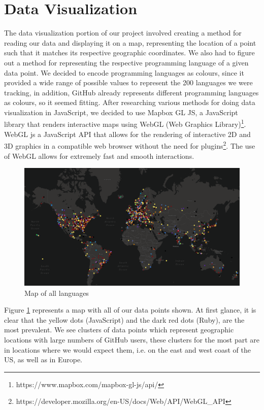 \documentclass[11pt]{article}
\begin{document}
\section{Data Visualization}
The data visualization portion of our project involved creating a method for reading our data and displaying it on a map, representing the location of a point such that it matches its respective geographic coordinates. We also had to figure out a method for representing the respective programming language of a given data point. We decided to encode programming languages as colours, since it provided a wide range of possible values to represent the 200 languages we were tracking, in addition, GitHub already represents different programming languages as colours, so it seemed fitting. 
After researching various methods for doing data visualization in JavaScript, we decided to use Mapbox GL JS, a JavaScript library that renders interactive maps using WebGL (Web Graphics Library)\footnote{https://www.mapbox.com/mapbox-gl-js/api/}. WebGL js a JavaScript API that allows for the rendering of interactive 2D and 3D graphics in a compatible web browser without the need for plugins\footnote{https://developer.mozilla.org/en-US/docs/Web/API/WebGL\_API}. The use of WebGL allows for extremely fast and smooth interactions.

\begin{figure}[H]
\centering
\includegraphics[scale=0.25]{Visualizer.png}
\caption{Map of all languages}
\label{fig:vis}
\end{figure}

Figure \ref{fig:vis} represents a map with all of our data points shown. At first glance, it is clear that the yellow dots (JavaScript) and the dark red dots (Ruby), are the most prevalent. We see clusters of data points which represent geographic locations with large numbers of GitHub users, these clusters for the most part are in locations where we would expect them, i.e. on the east and west coast of the US, as well as in Europe. 
\end{document}

